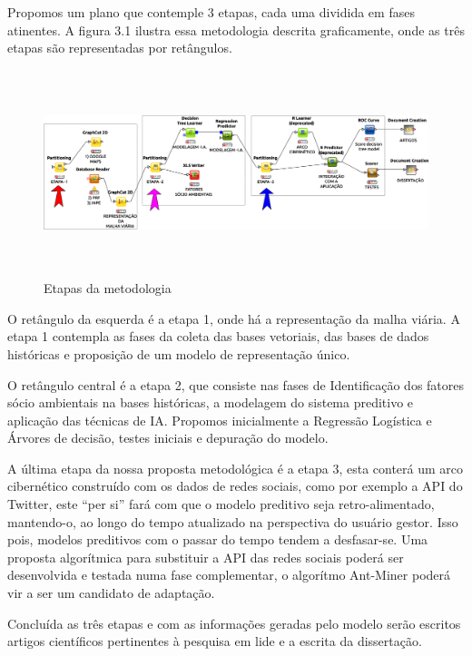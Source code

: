 Propomos um plano que contemple 3 etapas, cada uma dividida em fases atinentes. A figura 3.1 ilustra essa metodologia descrita graficamente, onde as três etapas são representadas por retângulos.
 
\begin{figure}[ht]
\centering
\caption{Etapas da metodologia}
\includegraphics[width=150mm, height=60mm]{Figuras/BigData/Etapas.png}
\end{figure}

 

 \pagebreak
 O retângulo da esquerda é a etapa 1, onde há a representação da malha viária.
 A etapa 1 contempla as fases da coleta das bases vetoriais, das bases de dados históricas e proposição de um modelo de representação único.
 
 O retângulo central é a etapa 2, que consiste nas fases de Identificação dos fatores sócio ambientais na bases históricas, a modelagem do sistema preditivo e aplicação das técnicas de IA. Propomos inicialmente a Regressão Logística e Árvores de decisão, testes iniciais e depuração do modelo.
 
 A última etapa da nossa proposta metodológica é a etapa 3, esta conterá um arco cibernético construído com os dados de redes sociais, como por exemplo a API do Twitter, este ``per si'' fará com que o modelo preditivo seja retro-alimentado, 
 mantendo-o, ao longo do tempo atualizado na perspectiva do usuário gestor. Isso pois, modelos preditivos com o passar do tempo tendem a desfasar-se. Uma proposta algorítmica para substituir a API das redes sociais 
 poderá ser desenvolvida e testada numa fase complementar, o algorítmo Ant-Miner poderá vir a ser um candidato de adaptação.
 
 Concluída as três etapas e com as informações geradas pelo modelo serão escritos artigos científicos  pertinentes à pesquisa em lide e a escrita da dissertação.
 
 
 
